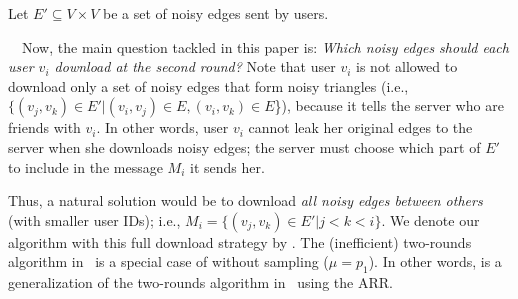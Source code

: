 Let $E' \subseteq V \times V$ be a set of noisy edges sent by users.

\smallskip
{}~~Now, the main question
tackled in this paper is: \textit{Which noisy edges should each user $v_i$
download at the second round?}
Note that
user $v_i$
is not allowed to
download only a set of noisy edges that form noisy triangles
(i.e., $\{(v_j,v_k) \in E' | (v_i,v_j) \in E, (v_i,v_k) \in E$\}),
because it tells the server
who are friends with $v_i$.
In other words, user $v_i$ cannot leak her original edges to the server when she
downloads noisy edges; the server must choose which part of $E'$ to include in
the message $M_i$ it sends her.

Thus, a natural solution would be to download \textit{all noisy edges between others}
(with smaller user IDs); i.e.,
$M_i =\{(v_j, v_k) \in E' | j<k<i\}$.
We denote our algorithm with this full download strategy by \AlgOne{}.
The (inefficient) two-rounds algorithm in~\cite{Imola_USENIX21} is a special case of \AlgOne{}
without sampling ($\mu = p_1$).
In other words, \AlgOne{} is a generalization of the two-rounds algorithm in~\cite{Imola_USENIX21} using the ARR.


